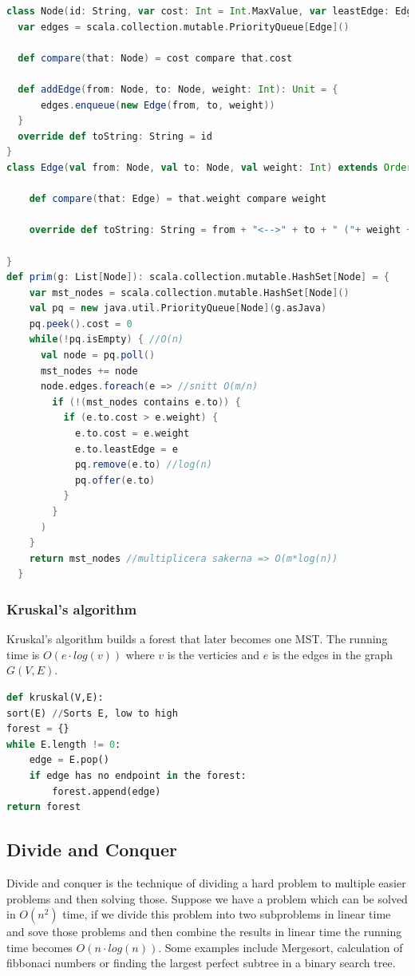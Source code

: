 \documentclass[12pt]{article} %
\begin{document}
\begin{lstlisting}[language=Scala, caption=Prim's in scala]
class Node(id: String, var cost: Int = Int.MaxValue, var leastEdge: Edge = null) extends Ordered[Node]{
  var edges = scala.collection.mutable.PriorityQueue[Edge]()

  def compare(that: Node) = cost compare that.cost

  def addEdge(from: Node, to: Node, weight: Int): Unit = {
      edges.enqueue(new Edge(from, to, weight))
  }
  override def toString: String = id
}
class Edge(val from: Node, val to: Node, val weight: Int) extends Ordered[Edge]{

    def compare(that: Edge) = that.weight compare weight

    override def toString: String = from + "<-->" + to + " ("+ weight +")"

}
def prim(g: List[Node]): scala.collection.mutable.HashSet[Node] = {
    var mst_nodes = scala.collection.mutable.HashSet[Node]()
    val pq = new java.util.PriorityQueue[Node](g.asJava)
    pq.peek().cost = 0
    while(!pq.isEmpty) { //O(n)
      val node = pq.poll()
      mst_nodes += node
      node.edges.foreach(e => //snitt O(m/n)
        if (!(mst_nodes contains e.to)) {
          if (e.to.cost > e.weight) {
            e.to.cost = e.weight
            e.to.leastEdge = e
            pq.remove(e.to) //log(n)
            pq.offer(e.to)
          }
        }
      )
    }
    return mst_nodes //multiplicera sakerna => O(m*log(n))
  }
\end{lstlisting}

\subsubsection{Kruskal's algorithm}
Kruskal's algorithm builds a forest that later becomes one MST. The running time is $O(e \cdot log(v))$ where $v$ is the verticies and $e$ is the edges in the graph $G(V, E)$. 

\begin{lstlisting}[language=Python, caption=Kruskal in python]
def kruskal(V,E):
sort(E) //Sorts E, low to high
forest = {}
while E.length != 0:
    edge = E.pop()
    if edge has no endpoint in the forest:
        forest.append(edge)
return forest
\end{lstlisting}

\subsection{Divide and Conquer}
Divide and conquer is the technique of dividing a hard problem to multiple easier problems and then solving those. Suppose we have a problem which can be solved in $O(n^2)$ time, if we divide this problem into two subproblems in linear time and sove those problems and then combine the results in linear time the running time becomes $O(n \cdot log(n))$. Some examples include Mergesort, calculation of fibbonaci numbers or finding the largest perfect subtree in a binary search tree.
\end{document}
